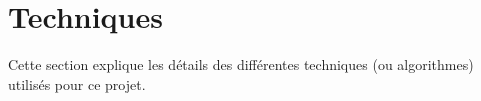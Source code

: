 \section{Techniques}

Cette section explique les détails des différentes techniques (ou algorithmes) utilisés
pour ce projet.

\newpage



\newpage



\newpage



\newpage



\newpage


